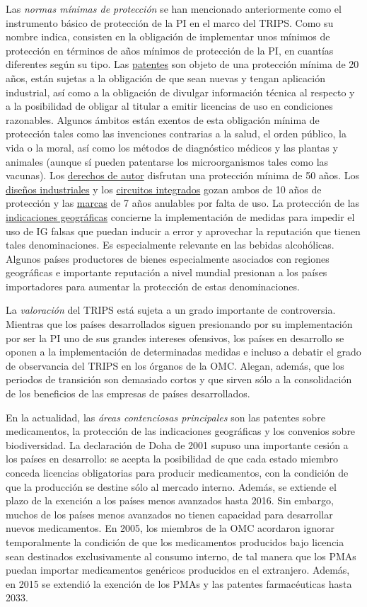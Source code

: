 \documentclass{nuevotema}
\begin{document}
Las \textit{normas mínimas de protección} se han mencionado anteriormente como el instrumento básico de protección de la PI en el marco del TRIPS. Como su nombre indica, consisten en la obligación de implementar unos mínimos de protección en términos de años mínimos de protección de la PI, en cuantías diferentes según su tipo. Las \underline{patentes} son objeto de una protección mínima de 20 años, están sujetas a la obligación de que sean nuevas y tengan aplicación industrial, así como a la obligación de divulgar información técnica al respecto y a la posibilidad de obligar al titular a emitir licencias de uso en condiciones razonables. Algunos ámbitos están exentos de esta obligación mínima de protección tales como las invenciones contrarias a la salud, el orden público, la vida o la moral, así como los métodos de diagnóstico médicos y las plantas y animales (aunque sí pueden patentarse los microorganismos tales como las vacunas). Los \underline{derechos de autor} disfrutan una protección mínima de 50 años. Los \underline{diseños industriales} y los \underline{circuitos integrados} gozan ambos de 10 años de protección y las \underline{marcas} de 7 años anulables por falta de uso. La protección de las \underline{indicaciones geográficas} concierne la implementación de medidas para impedir el uso de IG falsas que puedan inducir a error y aprovechar la reputación que tienen tales denominaciones. Es especialmente relevante en las bebidas alcohólicas. Algunos países productores de bienes especialmente asociados con regiones geográficas e importante reputación a nivel mundial presionan a los países importadores para aumentar la protección de estas denominaciones. 

La \textit{valoración} del TRIPS está sujeta a un grado importante de controversia. Mientras que los países desarrollados siguen presionando por su implementación por ser la PI uno de sus grandes intereses ofensivos, los países en desarrollo se oponen a la implementación de determinadas medidas e incluso a debatir el grado de observancia del TRIPS en los órganos de la OMC. Alegan, además, que los periodos de transición son demasiado cortos y que sirven sólo a la consolidación de los beneficios de las empresas de países desarrollados. 

En la actualidad, las \textit{áreas contenciosas principales} son las patentes sobre medicamentos, la protección de las indicaciones geográficas y los convenios sobre biodiversidad. La declaración de Doha de 2001 supuso una importante cesión a los países en desarrollo: se acepta la posibilidad de que cada estado miembro conceda licencias obligatorias para producir medicamentos, con la condición de que la producción se destine sólo al mercado interno. Además, se extiende el plazo de la exención a los países menos avanzados hasta 2016. Sin embargo, muchos de los países menos avanzados no tienen capacidad para desarrollar nuevos medicamentos. En 2005, los miembros de la OMC acordaron ignorar temporalmente la condición de que los medicamentos producidos bajo licencia sean destinados exclusivamente al consumo interno, de tal manera que los PMAs puedan importar medicamentos genéricos producidos en el extranjero. Además, en 2015 se extendió la exención de los PMAs y las patentes farmacéuticas hasta 2033. 
\end{document}
